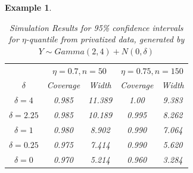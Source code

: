\documentclass[12pt]{article}
\theoremstyle{shortspace}
\newtheorem{example}{\quad Example}
\begin{document}
\begin{example}
\begin{table}[]
    \centering
    \caption{Simulation Results for 95\% confidence intervals for $\eta$-quantile from privatized data, generated by $Y \sim Gamma(2,4) + N(0, \delta)$}
    \begin{tabular}{c|c c|cc}
    & \multicolumn{2}{c|}{$\eta = 0.7, n = 50$} & \multicolumn{2}{c}{$\eta = 0.75, n= 150$}\\
         $\delta$ & Coverage & Width & Coverage & Width \\ \hline
         $\delta = 4$ & 0.985 & 11.389  & 1.00 & 9.383  \\
         $\delta = 2.25$  & 0.985 & 10.189 & 0.995 & 8.262   \\ 
         $\delta = 1$ & 0.980 &  8.902 & 0.990 & 7.064 \\
         $\delta = 0.25$ & 0.975 & 7.414 &  0.990 & 5.620\\
         $\delta  =0 $ & 0.970 & 5.214  & 0.960 & 3.284\\
         \hline
    \end{tabular}
    \label{tab:my_label}
\end{table}




\end{example}
\end{document}
